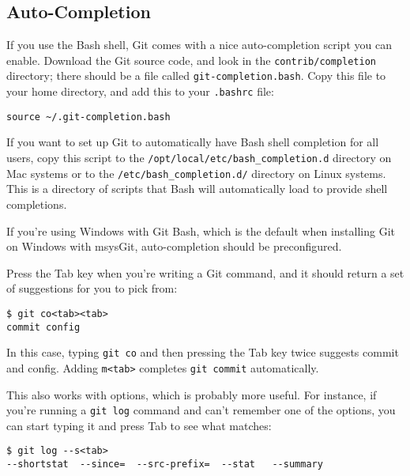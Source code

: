 \documentclass[a4paper]{book}
\newcounter{tab}[chapter]
\begin{document}
\subsection{Auto-Completion}

If you use the Bash shell, Git comes with a nice auto-completion script you can enable. Download the Git source code, and look in the \texttt{contrib/completion} directory; there should be a file called \texttt{git-completion.bash}. Copy this file to your home directory, and add this to your \texttt{.bashrc} file:

\begin{shaded}\begin{verbatim}
source ~/.git-completion.bash
\end{verbatim}\end{shaded}

If you want to set up Git to automatically have Bash shell completion for all users, copy this script to the \texttt{/opt/local/etc/bash\_completion.d} directory on Mac systems or to the \texttt{/etc/bash\_completion.d/} directory on Linux systems. This is a directory of scripts that Bash will automatically load to provide shell completions.

If you're using Windows with Git Bash, which is the default when installing Git on Windows with msysGit, auto-completion should be preconfigured.

Press the Tab key when you're writing a Git command, and it should return a set of suggestions for you to pick from:

\begin{shaded}\begin{verbatim}
$ git co<tab><tab>
commit config
\end{verbatim}\end{shaded}

In this case, typing \texttt{git co} and then pressing the Tab key twice suggests commit and config. Adding \texttt{m\textless{}tab\textgreater{}} completes \texttt{git commit} automatically.

This also works with options, which is probably more useful. For instance, if you're running a \texttt{git log} command and can't remember one of the options, you can start typing it and press Tab to see what matches:

\begin{shaded}\begin{verbatim}
$ git log --s<tab>
--shortstat  --since=  --src-prefix=  --stat   --summary
\end{verbatim}\end{shaded}
\end{document}
